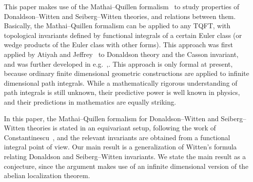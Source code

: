 \documentclass[a4paper,12pt,reqno,sumlimits]{amsart}
\theoremstyle{plain}
\theoremstyle{definition}
\providecommand{\1}{{\bf 1}}
\numberwithin{equation}{section}
\begin{document}
This paper makes use of the Mathai--Quillen formalism~\cite{mq} to study
properties of Donaldson--Witten and Seiberg--Witten theories, and relations
between them. Basically, the Mathai--Quillen formalism can be applied to any
TQFT, with topological invariants defined by functional integrals of a
certain Euler class (or wedge products of the Euler class with other forms).
This approach was first applied by Atiyah and Jeffrey~\cite{aj} to Donaldson
theory and the Casson invariant, and was further developed in
e.g.~\cite{radu},\cite{wu}.  This approach is only formal at present, because
ordinary finite dimensional geometric constructions are applied to infinite
dimensional path integrals.  While a mathematically rigorous understanding of
path integrals is still unknown, their predictive power is well known in
physics, and their predictions in mathematics are equally striking.

In this paper, the Mathai--Quillen formalism for Donaldson--Witten and
Seiberg--Witten theories is stated in an equivariant setup, following the
work of Constantinescu~\cite{radu}, and the relevant invariants are obtained
from a functional integral point of view. Our main result is a generalization
of Witten's formula relating Donaldson and Seiberg--Witten invariants. We
state the main result as a conjecture, since the argument makes use of an
infinite dimensional version of the abelian localization theorem.
\end{document}
